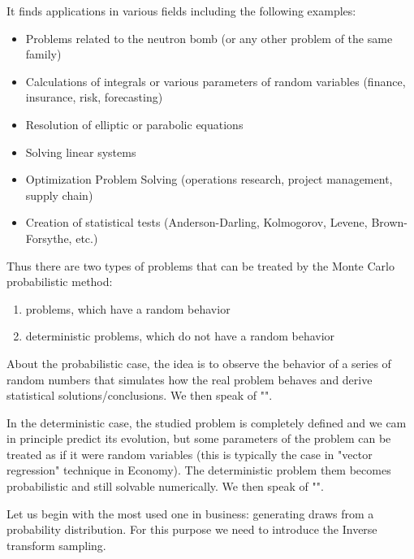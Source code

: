 	It finds applications in various fields including the following examples:
	\begin{itemize}
		\item Problems related to the neutron bomb (or any other problem of  the same family)

		\item Calculations of integrals or various parameters of random variables (finance, insurance, risk, forecasting)
	
		\item Resolution of elliptic or parabolic equations

		\item Solving linear systems

		\item Optimization Problem Solving (operations research, project management, supply chain)

		\item Creation of statistical tests (Anderson-Darling, Kolmogorov, Levene, Brown-Forsythe, etc.)
	\end{itemize}
	Thus there are two types of problems that can be treated by the Monte Carlo probabilistic method:
	\begin{enumerate}
		\item  problems, which have a random behavior 

		\item deterministic problems, which do not have a random behavior
	\end{enumerate}
	
	About the probabilistic case, the idea is to observe the behavior of a series of random numbers that simulates how the real problem behaves and derive statistical solutions/conclusions. We then speak of "".

	In the deterministic case, the studied problem is completely defined and we cam in principle predict its evolution, but some parameters of the problem can be treated as if it were random variables (this is typically the case in "vector regression" technique in Economy). The deterministic problem them becomes probabilistic and still solvable numerically. We then speak of "".
	
	Let us begin with the most used one in business: generating draws from a probability distribution. For this purpose we need to introduce the Inverse transform sampling.
	
